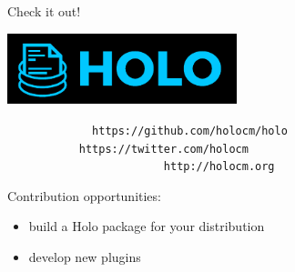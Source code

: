 \documentclass{beamer}
\begin{document}
\begin{frame}[plain,c]{Check it out!}
 \begin{center}
  \includegraphics[width=0.5\textwidth]{holo-logo.pdf}
 \end{center}

 \texttt{%
  ~~~~~~~~~~~~https://github.com/{\color{holoonblack}holocm}/holo\\
  ~~~~~~~~~~~https://twitter.com/{\color{holoonblack}holocm}\\
  ~~~~~~~~~~~~~~~~~~~~~~~~http://{\color{holoonblack}holocm}.org
 }

 \vspace{3em}
 \small Contribution opportunities:\vspace{-0.3em}
 \begin{itemize}
  \item build a Holo package for your distribution\vspace{-0.3em}
  \item develop new plugins
 \end{itemize}
\end{frame}
\end{document}
